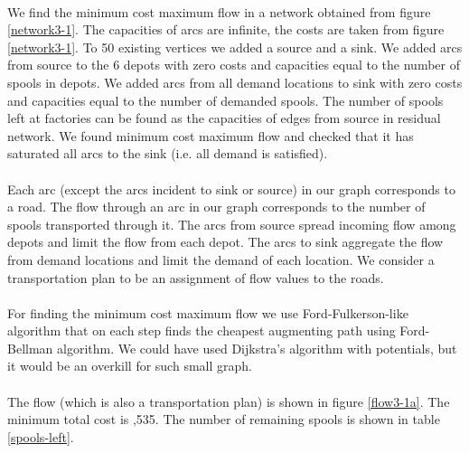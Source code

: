 \paragraph{}
We find the minimum cost maximum flow in a network obtained from figure \ref{network3-1}. The capacities of arcs are infinite, the costs are taken from figure \ref{network3-1}. To 50 existing vertices we added a source and a sink. We added arcs from source to the 6 depots with zero costs and capacities equal to the number of spools in depots. We added arcs from all demand locations to sink with zero costs and capacities equal to the number of demanded spools. The number of spools left at factories can be found as the capacities of edges from source in residual network. We found minimum cost maximum flow and checked that it has saturated all arcs to the sink (i.e. all demand is satisfied).

\paragraph{}
Each arc (except the arcs incident to sink or source) in our graph corresponds to a road. The flow through an arc in our graph corresponds to the number of spools transported through it. The arcs from source spread incoming flow among depots and limit the flow from each depot. The arcs to sink aggregate the flow from demand locations and limit the demand of each location. We consider a transportation plan to be an assignment of flow values to the roads.

\paragraph{}
For finding the minimum cost maximum flow we use Ford-Fulkerson-like algorithm that on each step finds the cheapest augmenting path using Ford-Bellman algorithm. We could have used Dijkstra's algorithm with potentials, but it would be an overkill for such small graph.

\paragraph{}
The flow (which is also a transportation plan) is shown in figure \ref{flow3-1a}. The minimum total cost is ,535. The number of remaining spools is shown in table \ref{spools-left}.

